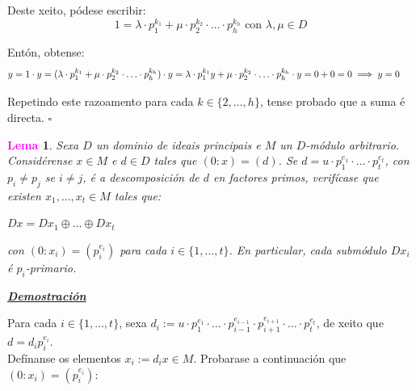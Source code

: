 \documentclass[twoside]{report}
\newcommand{\magbf}[1]{\textcolor{magenta}{\textbf{#1}}} %
\theoremstyle{mystyle}
\newtheorem{lem}{\magbf{Lema}}[chapter]
\newenvironment{lemma}
{\begin{mdframed}[linecolor = magenta,backgroundcolor = classicrose, linewidth = 2mm]\begin{lem}}
{\end{lem}\end{mdframed}}
\begin{document}
\vspace{3mm}

\noindent Deste xeito, pódese escribir:
$$1 = \lambda \cdot p_{1}^{k_{1}} + \mu \cdot p_{2}^{k_{2}} \cdot \ldots \cdot p_{h}^{k_{h}} \text{ con } \lambda, \mu \in D$$

\vspace{3mm}

\noindent Entón, obtense:
$$y = 1 \cdot y  = (\lambda \cdot p_{1}^{k_{1}} + \mu \cdot p_{2}^{k_{2}} \cdot \ldots \cdot p_{h}^{k_{h}}) \cdot y = \lambda \cdot p_{1}^{k_{1}}y + \mu \cdot p_{2}^{k_{2}} \cdot \ldots \cdot p_{h}^{k_{h}} \cdot y = 0 + 0 = 0 \implies y = 0 \hspace{5mm}
$$

\vspace{3mm}

\noindent Repetindo este razoamento para cada $k \in \{2, \dots, h\}$, tense probado que a suma é directa. $\square$\\

\pagebreak

\begin{lemma} \label{lem4.4}
Sexa $D$ un dominio de ideais principais e $M$ un $D$-módulo arbitrario. Considérense $x \in M$ e $d \in D$ tales que $(0 : x) = (d)$. Se $d = u \cdot p_{1}^{e_{1}} \cdot \ldots \cdot p_{t}^{e_{t}}$, con $p_{i} \neq p_{j}$ se $i \neq j$, é a descomposición de $d$ en factores primos, verifícase que existen $x_{1}, \dots, x_{t} \in M$ tales que:
\begin{center}
    $Dx = Dx_{1} \oplus \ldots \oplus Dx_{t}$ 
\end{center}
con $(0 : x_{i}) = (p_{i}^{e_{i}})$ para cada $i \in \{1, \dots, t\}$. En particular, cada submódulo $Dx_{i}$ é $p_{i}$-primario.
\end{lemma}

\vspace{2mm}

\noindent \textbf{\textit{\underline{Demostración}}}

\vspace{2mm}

\noindent Para cada $i \in \{1, \dots, t\}$, sexa $d_{i} := u \cdot p_{1}^{e_{1}} \cdot \ldots \cdot p_{i-1}^{e_{i-1}} \cdot p_{i+1}^{e_{i+1}} \cdot \ldots \cdot p_{t}^{e_{t}}$, de xeito que $d = d_{i}p_{i}^{e_{i}}$.\\

\noindent Defínanse os elementos $x_{i} := d_{i}x \in M$. Probarase a continuación que $(0 : x_{i}) = (p_{i}^{e_{i}})$:\\
\end{document}
